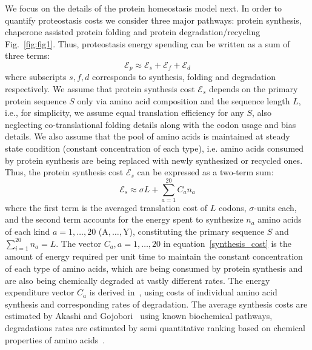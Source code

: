 \documentclass[10pt,letterpaper]{article}
\begin{document}
We focus on the details of the protein homeostasis model next. In order to quantify proteostasis costs we consider three major pathways: protein synthesis, chaperone assisted protein folding and protein degradation/recycling Fig.~\ref{fig:fig1}. Thus, proteostasis energy spending can be written as a sum of three terms:
\begin{equation}
	\label{proteostasis_cost_expansion}
	\mathcal{E}_{p} \approx \mathcal{E}_{s} + \mathcal{E}_{f} + \mathcal{E}_{d}
\end{equation}
where subscripts $s,f,d$ corresponds to synthesis, folding and degradation respectively. We assume that protein synthesis cost $\mathcal{E}_{s}$ depends on the primary protein sequence $S$ only via amino acid composition and the sequence length $L$, i.e., for simplicity, we assume equal translation efficiency for any $S$, also neglecting co-translational folding details along with the codon usage and bias details. We also assume that the pool of amino acids is maintained at steady state condition (constant concentration of each type), i.e. amino acids consumed by protein synthesis are being replaced with newly synthesized or recycled ones. Thus, the protein synthesis cost $\mathcal{E}_{s}$ can be expressed as a two-term sum:
\begin{equation}
	\label{synthesis_cost}
	\mathcal{E}_{s} \approx \sigma L + \sum\limits_{a=1}^{20}C_{a}n_{a}
\end{equation}
where the first term is the averaged translation cost of $L$ codons, $\sigma$-units each, and the second term accounts for the energy spent to synthesize $n_{a}$ amino acids of each kind $a=1,\dots,20$ ($\mathrm{A},\dots,\mathrm{Y}$), constituting the primary sequence $S$ and $\sum\limits_{i=1}^{20}n_{a} = L$. The vector $C_{a}, a=1,\dots,20$ in equation~\eqref{synthesis_cost} is the amount of energy required per unit time to maintain the constant concentration of each type of amino acids, which are being consumed by protein synthesis and are also being chemically degraded at vastly different rates. The energy expenditure vector $C_{a}$ is derived in~\cite{Krick2014Amino}, using costs of individual amino acid synthesis and corresponding rates of degradation. The average synthesis costs are estimated by Akashi and Gojobori~\cite{Akashi2002Metabolic} using known biochemical pathways, degradations rates are estimated by semi quantitative ranking based on chemical properties of amino acids~\cite{Krick2014Amino}.
\end{document}
